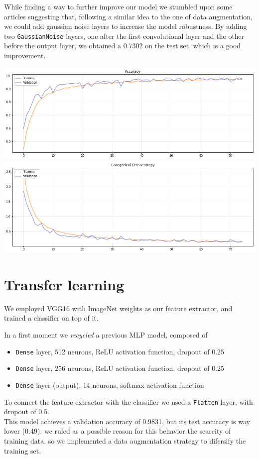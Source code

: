 \documentclass[10.5pt,a4paper,twocolumn]{article}
\begin{document}
While finding a way to further improve our model we stumbled upon some articles suggesting that, 
following a similar idea to the one of data augmentation, we could add gaussian noise layers to increase the model robustness.
By adding two \texttt{GaussianNoise} layers, one after the first convolutional layer and the other before the output layer,
we obtained a 0.7302 on the test set, which is a good improvement.
\begin{minipage}{0.5\textwidth}
    \includegraphics[width=\textwidth]{../graphs/accuracy.png}
    \includegraphics[width=\textwidth]{../graphs/crossentropy.png}
\end{minipage}


\section{Transfer learning}
\label{sec:transfer_learning}
We employed VGG16 with ImageNet weights as our feature extractor, and trained a classifier on top of it.

In a first moment we \textit{recycled} a previous MLP model, composed of
\begin{itemize}
    \item \texttt{Dense} layer, 512 neurons, ReLU activation function, dropout of 0.25
    \item \texttt{Dense} layer, 256 neurons, ReLU activation function, dropout of 0.25
    \item \texttt{Dense} layer (output), 14 neurons, softmax activation function
\end{itemize}
To connect the feature extractor with the classifier we used a \texttt{Flatten} layer, with dropout of 0.5.\\
This model achieves a validation accuracy of 0.9831, but its test accuracy is way lower (0.49): we ruled as a possible reason
for this behavior the scarcity of training data, so we implemented a data augmentation strategy to difersify the training set. 
\end{document}
